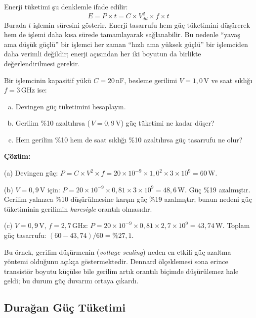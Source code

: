 Enerji tüketimi şu denklemle ifade edilir:
\begin{equation}
E = P \times t = C \times V_{dd}^2 \times f \times t
\label{eq:enerji}
\end{equation}
Burada $t$ işlemin süresini gösterir. Enerji tasarrufu hem güç tüketimini düşürerek hem de işlemi daha kısa sürede tamamlayarak sağlanabilir. Bu nedenle ``yavaş ama düşük güçlü'' bir işlemci her zaman ``hızlı ama yüksek güçlü'' bir işlemciden daha verimli değildir; enerji açısından her iki boyutun da birlikte değerlendirilmesi gerekir.

\begin{ornek}[1.5]
\label{orn:guc-hesaplama}
Bir işlemcinin kapasitif yükü $C = 20$\,nF, besleme gerilimi $V = 1{,}0$\,V ve saat sıklığı $f = 3$\,GHz ise:
\begin{enumerate}[(a)]
\item Devingen güç tüketimini hesaplayın.
\item Gerilim \%10 azaltılırsa (\,$V = 0{,}9$\,V) güç tüketimi ne kadar düşer?
\item Hem gerilim \%10 hem de saat sıklığı \%10 azaltılırsa güç tasarrufu ne olur?
\end{enumerate}

\textbf{Çözüm:}

(a) Devingen güç: $P = C \times V^2 \times f = 20 \times 10^{-9} \times 1{,}0^2 \times 3 \times 10^{9} = 60$\,W.

(b) $V = 0{,}9$\,V için: $P = 20 \times 10^{-9} \times 0{,}81 \times 3 \times 10^{9} = 48{,}6$\,W. Güç \%19 azalmıştır. Gerilim yalnızca \%10 düşürülmesine karşın güç \%19 azalmıştır; bunun nedeni güç tüketiminin gerilimin \emph{karesiyle} orantılı olmasıdır.

(c) $V = 0{,}9$\,V, $f = 2{,}7$\,GHz: $P = 20 \times 10^{-9} \times 0{,}81 \times 2{,}7 \times 10^{9} = 43{,}74$\,W. Toplam güç tasarrufu: $(60 - 43{,}74)/60 = \%27{,}1$.

Bu örnek, gerilim düşürmenin (\emph{voltage scaling}) neden en etkili güç azaltma yöntemi olduğunu açıkça göstermektedir. Dennard ölçeklemesi sona erince transistör boyutu küçülse bile gerilim artık orantılı biçimde düşürülemez hale geldi; bu durum güç duvarını ortaya çıkardı.
\end{ornek}


\subsection{Durağan Güç Tüketimi}
\label{sec:duragan-guc}

